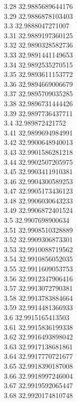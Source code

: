 {3.28	32.9885689644176\\
3.29	32.9886878103403\\
3.3	32.9888047271007\\
3.31	32.9889197360125\\
3.32	32.9890328582736\\
3.33	32.9891441149653\\
3.34	32.9892535270515\\
3.35	32.9893611153772\\
3.36	32.9894669006679\\
3.37	32.9895709035285\\
3.38	32.9896731444426\\
3.39	32.9897736437711\\
3.4	32.989872421752\\
3.41	32.9899694984991\\
3.42	32.9900648940013\\
3.43	32.9901586281218\\
3.44	32.9902507205975\\
3.45	32.9903411910381\\
3.46	32.9904300589253\\
3.47	32.9905173436123\\
3.48	32.9906030643233\\
3.49	32.9906872401524\\
3.5	32.9907698900634\\
3.51	32.9908510328889\\
3.52	32.9909306873301\\
3.53	32.9910088719562\\
3.54	32.9910856052035\\
3.55	32.9911609053753\\
3.56	32.9912347906416\\
3.57	32.9913072790381\\
3.58	32.9913783884664\\
3.59	32.9914481366933\\
3.6	32.9915165413503\\
3.61	32.9915836199338\\
3.62	32.9916493898042\\
3.63	32.9917138681861\\
3.64	32.9917770721677\\
3.65	32.9918390187008\\
3.66	32.9918997246004\\
3.67	32.9919592065447\\
3.68	32.9920174810748\\
}
